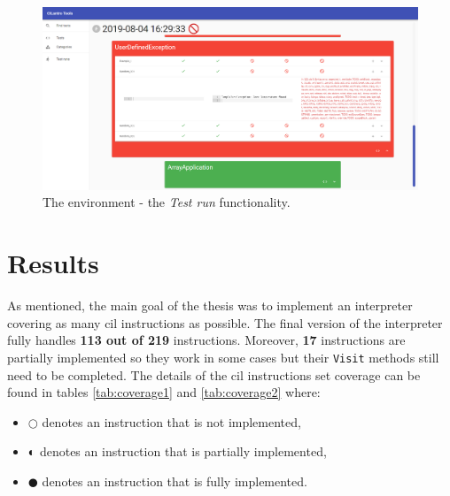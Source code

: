\documentclass[declaration,shortabstract,english,mgr]{iithesis}
\begin{document}
\begin{figure}
	\includegraphics[width=1\textwidth]{tools_run.png}
    \centering
    \caption{The environment - the \textit{Test run} functionality.}
    \label{fig:tools_run}
\end{figure}

\clearpage


\chapter{Results}
\label{sec:results}

As mentioned, the main goal of the thesis was to implement an interpreter covering as many \acrshort{cil} instructions as possible. The final version of the interpreter fully handles \textbf{113 out of 219} instructions. Moreover, \textbf{17} instructions are partially implemented so they work in some cases but their \texttt{Visit} methods still need to be completed. The details of the \acrshort{cil} instructions set coverage can be found in tables \ref{tab:coverage1} and \ref{tab:coverage2} where:
\begin{itemize}
	\item{$\Circle$ denotes an instruction that is not implemented,}
	\item{$\LEFTcircle$ denotes an instruction that is partially implemented,}
	\item{$\CIRCLE$ denotes an instruction that is fully implemented.}
\end{itemize}
\end{document}
